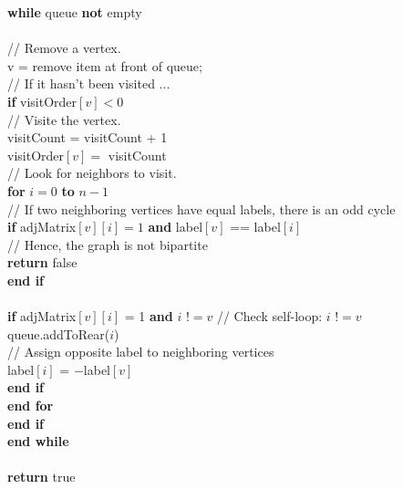 \documentclass{article}
\begin{document}
	\indent \textbf{while} queue \textbf{not} empty \\
	\\
	\indent \indent // Remove a vertex. \\
	\indent \indent v = remove item at front of queue; \\
	\indent \indent // If it hasn't been visited ... \\
	\indent \indent \textbf{if} visitOrder$[v] < 0$ \\
	\indent \indent \indent // Visite the vertex. \\
	\indent \indent \indent visitCount = visitCount + 1 \\
	\indent \indent \indent visitOrder$[v] = $ visitCount \\
	\indent \indent \indent // Look for neighbors to visit. \\
	\indent \indent \indent \textbf{for} $i = 0$ \textbf{to} $n-1$ \\
	\indent \indent \indent \indent // If two neighboring vertices have equal labels, there is an odd cycle \\
	\indent \indent \indent \indent \textbf{if} adjMatrix$[v][i] = 1$ \textbf{and} label$[v]$ == label$[i]$ \\
	\indent \indent \indent \indent \indent // Hence, the graph is not bipartite \\
	\indent \indent \indent \indent \indent \textbf{return} false \\
	\indent \indent \indent \indent \textbf{end if} \\
	\\
	\indent \indent \indent \indent \textbf{if} adjMatrix$[v][i]$ = 1 \textbf{and} $i$ !$= v$ \qquad // Check self-loop: $i$ !$= v$ \\
	\indent \indent \indent \indent \indent queue.addToRear($i$) \\
	\indent \indent \indent \indent \indent // Assign opposite label to neighboring vertices\\
	\indent \indent \indent \indent \indent label$[i]$ = $-$label$[v]$ \\
	\indent \indent \indent \indent \textbf{end if} \\
	\indent \indent \indent \textbf{end for} \\
	\indent \indent \textbf{end if} \\
	\indent \textbf{end while} \\
	\\
	\indent \textbf{return} true\\
\end{document}
